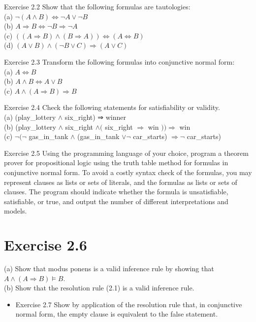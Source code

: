 \documentclass[10pt]{book}
\begin{document}
Exercise 2.2 Show that the following formulas are tautologies:\\
(a) $\neg(A \wedge B) \Leftrightarrow \neg A \vee \neg B$\\
(b) $A \Rightarrow B \Leftrightarrow \neg B \Rightarrow \neg A$\\
(c) $((A \Rightarrow B) \wedge(B \Rightarrow A)) \Leftrightarrow(A \Leftrightarrow B)$\\
(d) $(A \vee B) \wedge(\neg B \vee C) \Rightarrow(A \vee C)$

Exercise 2.3 Transform the following formulas into conjunctive normal form:\\
(a) $A \Leftrightarrow B$\\
(b) $A \wedge B \Leftrightarrow A \vee B$\\
(c) $A \wedge(A \Rightarrow B) \Rightarrow B$

Exercise 2.4 Check the following statements for satisfiability or validity.\\
(a) (play\_lottery $\wedge$ six\_right) ⇒ winner\\
(b) (play\_lottery $\wedge$ six\_right $\wedge($ six\_right $\Rightarrow$ win $)) \Rightarrow$ win\\
(c) $\neg(\neg$ gas\_in\_tank $\wedge$ (gas\_in\_tank $\vee \neg$ car\_starts) $\Rightarrow \neg$ car\_starts)

Exercise 2.5 Using the programming language of your choice, program a theorem prover for propositional logic using the truth table method for formulas in conjunctive normal form. To avoid a costly syntax check of the formulas, you may represent clauses as lists or sets of literals, and the formulas as lists or sets of clauses. The program should indicate whether the formula is unsatisfiable, satisfiable, or true, and output the number of different interpretations and models.

\section*{Exercise 2.6}
(a) Show that modus ponens is a valid inference rule by showing that $A \wedge(A \Rightarrow B) \models B$.\\

(b) Show that the resolution rule (2.1) is a valid inference rule.

\begin{itemize}
  \item Exercise 2.7 Show by application of the resolution rule that, in conjunctive normal form, the empty clause is equivalent to the false statement.
\end{itemize}
\end{document}
